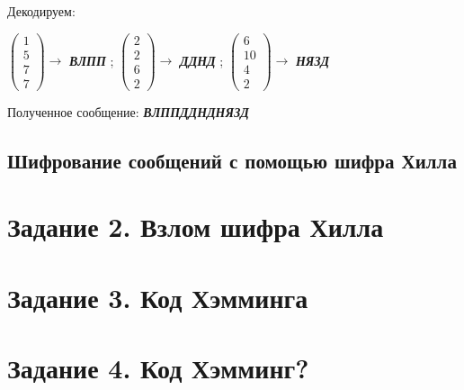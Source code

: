 \documentclass[a5paper, 10pt]{article}
\theoremstyle{definition}
\theoremstyle{plain}
\theoremstyle{remark}
\begin{document}
Декодируем:
\begin{center}
 $ \begin{pmatrix}
 1\\
5\\
7\\
7
\end{pmatrix} \to$ \textbf{\textit{ВЛПП}} ;
 $ \begin{pmatrix}
 2\\
2 \\
6\\
2
\end{pmatrix} \to$ \textbf{\textit{ДДНД}} ;
 $ \begin{pmatrix}
 6\\
10\\
4\\
2
\end{pmatrix} \to$ \textbf{\textit{НЯЗД}} 
 \\

\end{center}
Полученное сообщение:  \textbf{\textit{ВЛППДДНДНЯЗД}}

\subsection{Шифрование сообщений с помощью шифра Хилла}



\section{Задание 2. Взлом шифра Хилла}	

\section{Задание 3. Код Хэмминга}

\section{Задание 4. Код Хэмминг?}
\end{document}
